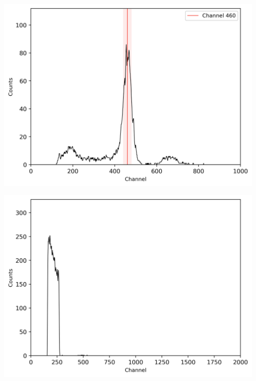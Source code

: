 \begin{center}
    \begin{adjustbox}{max width=\linewidth, keepaspectratio}
        \includegraphics[]{png/comptonpeak}
    \end{adjustbox}
    \label{fig:}
\end{center}
%
\begin{center}
    \begin{adjustbox}{max width=\linewidth, keepaspectratio}
        \includegraphics[]{png/signal2eneriewindow}
    \end{adjustbox}
    \label{fig:}
\end{center}
%
